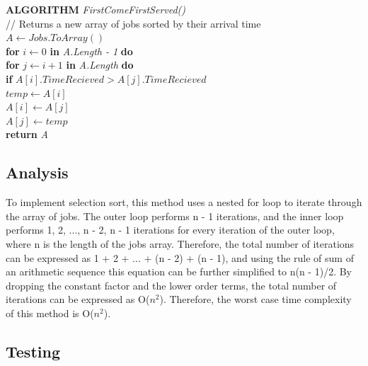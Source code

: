 \documentclass[12pt,a4paper]{article}
\begin{document}
			\textbf{ALGORITHM} \textit{FirstComeFirstServed()}\\
			\null\hspace{1cm}// Returns a new array of jobs sorted by their arrival time\\
			\null\hspace{1cm}\textit{$A \gets Jobs.ToArray()$}\\
			\null\hspace{1cm}\textbf{for} \textit{$i \gets 0$} \textbf{in} \textit{A.Length - 1} \textbf{do}\\
			\null\hspace{2cm}\textbf{for} \textit{$j \gets i + 1$} \textbf{in} \textit{A.Length} \textbf{do}\\
			\null\hspace{3cm}\textbf{if} \textit{$A[i].TimeRecieved > A[j].TimeRecieved$}\\
			\null\hspace{4cm}\textit{$temp \gets A[i]$}\\
			\null\hspace{4cm}\textit{$A[i] \gets A[j]$}\\
			\null\hspace{4cm}\textit{$A[j] \gets temp$}\\
			\null\hspace{1cm}\textbf{return} \textit{A}\\
		
		\subsection{Analysis}
			To implement selection sort, this method uses a nested for loop to iterate through the
			array of jobs. The outer loop performs n - 1 iterations, and the inner loop performs 
			1, 2, ..., n - 2, n - 1 iterations for every iteration of the outer loop, where n is 
			the length of the jobs array. Therefore, the total number of iterations can be expressed as 
			1 + 2 + ... + (n - 2) + (n - 1), and using the rule of sum of an arithmetic sequence 
			this equation can be further simplified to n(n - 1)/2. By dropping the constant factor and 
			the lower order terms, the total number of iterations can be expressed as O($n ^ 2$). Therefore, 
			the worst case time complexity of this method is O($n ^ 2$).\\
			
		\subsection{Testing}
	\newpage
\end{document}
